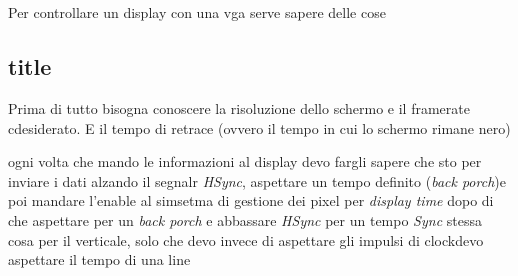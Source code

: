 \section{}
Per controllare un display con una vga serve sapere delle cose

\subsection{title}
Prima di tutto bisogna conoscere la risoluzione dello schermo e il framerate cdesiderato. E il tempo di retrace (ovvero il tempo in cui lo schermo rimane nero)

ogni volta che mando le informazioni al display devo fargli sapere che sto per inviare i dati alzando il segnalr \textit{HSync}, aspettare un tempo definito (\textit{back porch})e poi mandare l'enable al simsetma di gestione dei pixel per \textit{display time} dopo di che aspettare per un \textit{back porch} e abbassare \textit{HSync} per un tempo \textit{Sync}
stessa cosa per il verticale, solo che devo invece di aspettare gli impulsi di clockdevo aspettare il tempo di una line